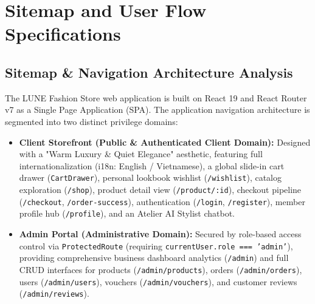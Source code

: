 \documentclass[12pt,a4paper,oneside]{report}
\begin{document}
\section{Sitemap and User Flow Specifications}

\subsection{Sitemap \& Navigation Architecture Analysis}
The LUNE Fashion Store web application is built on React 19 and React Router v7 as a Single Page Application (SPA). The application navigation architecture is segmented into two distinct privilege domains:
\begin{itemize}[leftmargin=1.2cm]
    \item \textbf{Client Storefront (Public \& Authenticated Client Domain):} Designed with a "Warm Luxury \& Quiet Elegance" aesthetic, featuring full internationalization (i18n: English / Vietnamese), a global slide-in cart drawer (\texttt{CartDrawer}), personal lookbook wishlist (\texttt{/wishlist}), catalog exploration (\texttt{/shop}), product detail view (\texttt{/product/:id}), checkout pipeline (\texttt{/checkout}, \texttt{/order-success}), authentication (\texttt{/login}, \texttt{/register}), member profile hub (\texttt{/profile}), and an Atelier AI Stylist chatbot.
    \item \textbf{Admin Portal (Administrative Domain):} Secured by role-based access control via \texttt{ProtectedRoute} (requiring \texttt{currentUser.role === 'admin'}), providing comprehensive business dashboard analytics (\texttt{/admin}) and full CRUD interfaces for products (\texttt{/admin/products}), orders (\texttt{/admin/orders}), users (\texttt{/admin/users}), vouchers (\texttt{/admin/vouchers}), and customer reviews (\texttt{/admin/reviews}).
\end{itemize}
\end{document}
